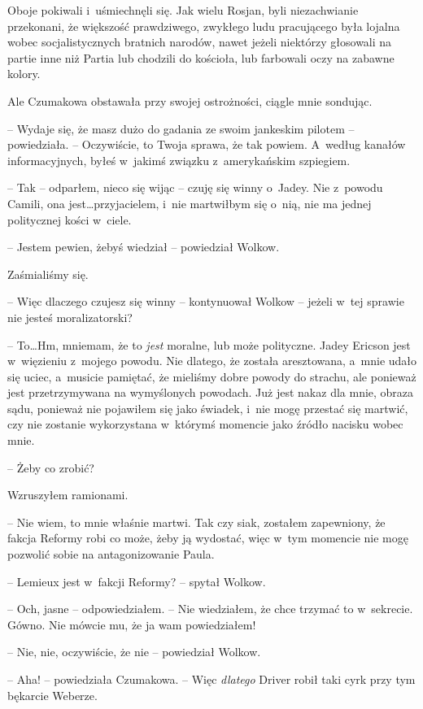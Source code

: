 \documentclass[oneside,polish,12pt,sfheadings]{mwbk}
\begin{document}
Oboje pokiwali i~uśmiechnęli się. Jak wielu Rosjan, byli niezachwianie
przekonani, że większość prawdziwego, zwykłego ludu pracującego była
lojalna wobec socjalistycznych bratnich narodów, nawet jeżeli niektórzy
głosowali na partie inne niż Partia lub chodzili do kościoła, lub
farbowali oczy na zabawne kolory.

Ale Czumakowa obstawała przy swojej ostrożności, ciągle mnie sondując.

-- Wydaje się, że masz dużo do gadania ze swoim jankeskim pilotem -- powiedziała. -- Oczywiście, to Twoja sprawa, że tak powiem. A~według
kanałów informacyjnych, byłeś w~jakimś związku z~amerykańskim szpiegiem.

-- Tak -- odparłem, nieco się wijąc -- czuję się winny o~Jadey. Nie z~powodu Camili, ona jest\ldots przyjacielem, i~nie martwiłbym się o~nią, nie
ma jednej politycznej kości w~ciele.

-- Jestem pewien, żebyś wiedział -- powiedział Wolkow.

Zaśmialiśmy się.

-- Więc dlaczego czujesz się winny -- kontynuował Wolkow -- jeżeli w~tej
sprawie nie jesteś moralizatorski?

-- To\ldots Hm, mniemam, że to \emph{jest} moralne, lub może polityczne.
Jadey Ericson jest w~więzieniu z~mojego powodu. Nie dlatego, że została
aresztowana, a~mnie udało się uciec, a~musicie pamiętać, że mieliśmy
dobre powody do strachu, ale ponieważ jest przetrzymywana na wymyślonych
powodach. Już jest nakaz dla mnie, obraza sądu, ponieważ nie pojawiłem
się jako świadek, i~nie mogę przestać się martwić, czy nie zostanie
wykorzystana w~którymś momencie jako źródło nacisku wobec mnie.

-- Żeby co zrobić?

Wzruszyłem ramionami. 

-- Nie wiem, to mnie właśnie martwi. Tak czy siak,
zostałem zapewniony, że fakcja Reformy robi co może, żeby ją wydostać,
więc w~tym momencie nie mogę pozwolić sobie na antagonizowanie Paula.

-- Lemieux jest w~fakcji Reformy? -- spytał Wolkow.

-- Och, jasne -- odpowiedziałem. -- Nie wiedziałem, że chce trzymać to w~sekrecie. Gówno. Nie mówcie mu, że ja wam powiedziałem!

-- Nie, nie, oczywiście, że nie -- powiedział Wolkow.

-- Aha! -- powiedziała Czumakowa. -- Więc \emph{dlatego} Driver robił taki
cyrk przy tym bękarcie Weberze.
\end{document}

